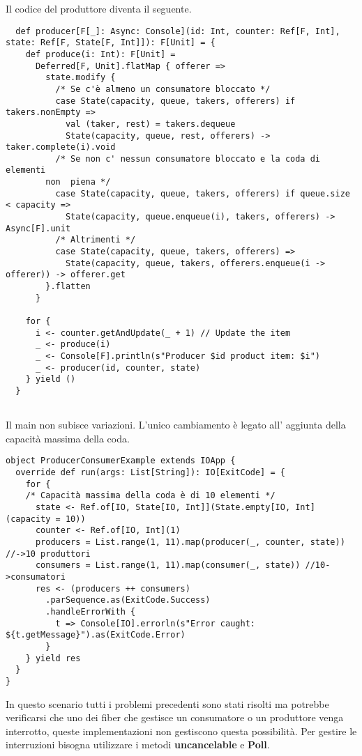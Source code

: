 \noindent Il codice del produttore diventa il seguente.
\begin{verbatim}
  def producer[F[_]: Async: Console](id: Int, counter: Ref[F, Int], state: Ref[F, State[F, Int]]): F[Unit] = {
    def produce(i: Int): F[Unit] =
      Deferred[F, Unit].flatMap { offerer =>
        state.modify {
          /* Se c'è almeno un consumatore bloccato */
          case State(capacity, queue, takers, offerers) if takers.nonEmpty =>
            val (taker, rest) = takers.dequeue
            State(capacity, queue, rest, offerers) -> taker.complete(i).void
          /* Se non c' nessun consumatore bloccato e la coda di elementi
        non  piena */
          case State(capacity, queue, takers, offerers) if queue.size < capacity =>
            State(capacity, queue.enqueue(i), takers, offerers) -> Async[F].unit
          /* Altrimenti */
          case State(capacity, queue, takers, offerers) =>
            State(capacity, queue, takers, offerers.enqueue(i -> offerer)) -> offerer.get
        }.flatten
      }

    for {
      i <- counter.getAndUpdate(_ + 1) // Update the item
      _ <- produce(i)
      _ <- Console[F].println(s"Producer $id product item: $i")
      _ <- producer(id, counter, state)
    } yield ()
  }
    
\end{verbatim}

\noindent Il main non subisce variazioni. L'unico cambiamento è legato all' aggiunta della capacità massima della coda.

\begin{verbatim}
object ProducerConsumerExample extends IOApp {
  override def run(args: List[String]): IO[ExitCode] = {
    for {
    /* Capacità massima della coda è di 10 elementi */
      state <- Ref.of[IO, State[IO, Int]](State.empty[IO, Int](capacity = 10))
      counter <- Ref.of[IO, Int](1)
      producers = List.range(1, 11).map(producer(_, counter, state)) //->10 produttori
      consumers = List.range(1, 11).map(consumer(_, state)) //10->consumatori
      res <- (producers ++ consumers)
        .parSequence.as(ExitCode.Success) 
        .handleErrorWith {
          t => Console[IO].errorln(s"Error caught: ${t.getMessage}").as(ExitCode.Error)
        }
    } yield res
  }
}
\end{verbatim}
\noindent In questo scenario tutti i problemi precedenti sono stati risolti ma potrebbe verificarsi che uno dei fiber che gestisce un consumatore o un produttore venga interrotto, queste implementazioni non gestiscono questa possibilità. Per gestire le interruzioni bisogna utilizzare i metodi \textbf{uncancelable} e \textbf{Poll}.

